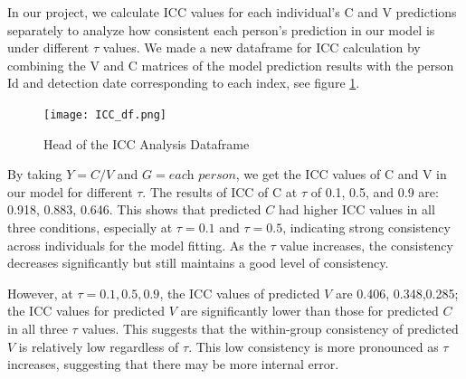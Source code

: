 \documentclass{article}
\begin{document}
In our project, we calculate ICC values for each individual's C and V predictions separately to analyze how consistent each person's prediction in our model is under different $\tau$ values. We made a new dataframe for ICC calculation by combining the V and C matrices of the model prediction results with the person Id and detection date corresponding to each index, see figure \ref{icc}.

\begin{figure}[ht]
\centering
\texttt{[image: ICC\_df.png]} 
\caption{Head of the ICC Analysis Dataframe} 
\label{icc} 
\end{figure}

By taking $Y = \textit{C/V}$ and $ G = \textit{each person}$, we get the ICC values of C and V in our model for different $\tau$.
The results of ICC of C at $\tau$ of 0.1, 0.5, and 0.9 are: 0.918, 0.883, 0.646. This shows that predicted $C$ had higher ICC values in all three conditions, especially at $\tau = 0.1 $ and $\tau = 0.5$, indicating strong consistency across individuals for the model fitting. As the $\tau$ value increases, the consistency decreases significantly but still maintains a good level of consistency.

However, at $\tau=0.1,0.5,0.9$, the ICC values of predicted $V$ are  0.406, 0.348,0.285; the ICC values for predicted $V$ are significantly lower than those for predicted $C$ in all three $\tau$ values. This suggests that the within-group consistency of predicted $V$ is relatively low regardless of $\tau$. This low consistency is more pronounced as $\tau$ increases, suggesting that there may be more internal error.


\end{document}
